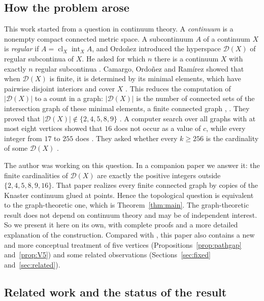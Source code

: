 \documentclass[11pt]{amsart}
\theoremstyle{definition}
\theoremstyle{remark}
\newcommand{\D}{\mathcal{D}}
\newcommand{\cl}{\operatorname{cl}}
\newcommand{\intr}{\operatorname{int}}
\begin{document}
\subsection{How the problem arose}\label{subsec:origin}

This work started from a question in continuum theory. A \emph{continuum} is a nonempty compact connected metric space. A subcontinuum $A$ of a continuum $X$ is \emph{regular} if $A=\cl_X\intr_XA$, and Ordo\~nez \cite{Or18} introduced the hyperspace $\D(X)$ of regular subcontinua of $X$. He asked for which $n$ there is a continuum $X$ with exactly $n$ regular subcontinua \cite[Problem~4.14]{Or18}. Camargo, Ordo\~nez and Ram\'irez \cite{CORa} showed that when $\D(X)$ is finite, it is determined by its minimal elements, which have pairwise disjoint interiors and cover $X$ \cite[Theorem~3.16]{CORa}. This reduces the computation of $|\D(X)|$ to a count in a graph: $|\D(X)|$ is the number of connected sets of the intersection graph of these minimal elements, a finite connected graph \cite{CORa}, \cite[Proposition~3.2]{AA2}. They proved that $|\D(X)|\notin\{2,4,5,8,9\}$ \cite[Proposition~3.18]{CORa}. A computer search over all graphs with at most eight vertices showed that $16$ does not occur as a value of $c$, while every integer from $17$ to $255$ does \cite[Remark~3.20]{CORa}. They asked whether every $k\ge256$ is the cardinality of some $\D(X)$ \cite[Question~3.21]{CORa}.

The author was working on this question. In a companion paper \cite{AA2} we answer it: the finite cardinalities of $\D(X)$ are exactly the positive integers outside $\{2,4,5,8,9,16\}$. That paper realizes every finite connected graph by copies of the Knaster continuum glued at points. Hence the topological question is equivalent to the graph-theoretic one, which is Theorem~\ref{thm:main}. The graph-theoretic result does not depend on continuum theory and may be of independent interest. So we present it here on its own, with complete proofs and a more detailed explanation of the construction. Compared with \cite{AA2}, this paper also contains a new and more conceptual treatment of five vertices (Propositions~\ref{prop:pathgap} and~\ref{prop:V5}) and some related observations (Sections~\ref{sec:fixed} and~\ref{sec:related}).

\subsection{Related work and the status of the result}\label{subsec:literature}
\end{document}

